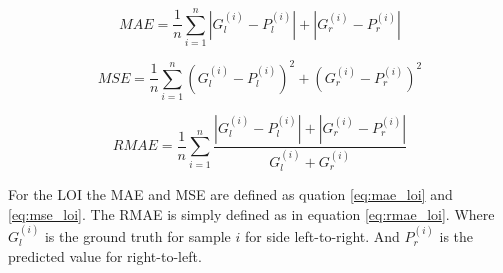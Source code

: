 \begin{equation}
\label{eq:mae_loi}
	MAE = \frac{1}{n}\sum^n_{i=1}|G_l^{(i)}-P_l^{(i)}|+|G_r^{(i)}-P_r^{(i)}|
\end{equation}

\begin{equation}
\label{eq:mse_loi}
	MSE = \frac{1}{n}\sum^n_{i=1}(G_l^{(i)}-P_l^{(i)})^2+(G_r^{(i)}-P_r^{(i)})^2
\end{equation}

\begin{equation}
\label{eq:rmae_loi}
	RMAE = \frac{1}{n}\sum^n_{i=1}\frac{|G_l^{(i)}-P_l^{(i)}|+|G_r^{(i)}-P_r^{(i)}|}{G_l^{(i)} + G_r^{(i)}}
\end{equation}

For the LOI the MAE and MSE are defined as quation \ref{eq:mae_loi} and \ref{eq:mse_loi}. The RMAE is simply defined as in equation \ref{eq:rmae_loi}. Where $G_l^{(i)}$ is the ground truth for sample $i$ for side left-to-right. And $P_r^{(i)}$ is the predicted value for right-to-left.
